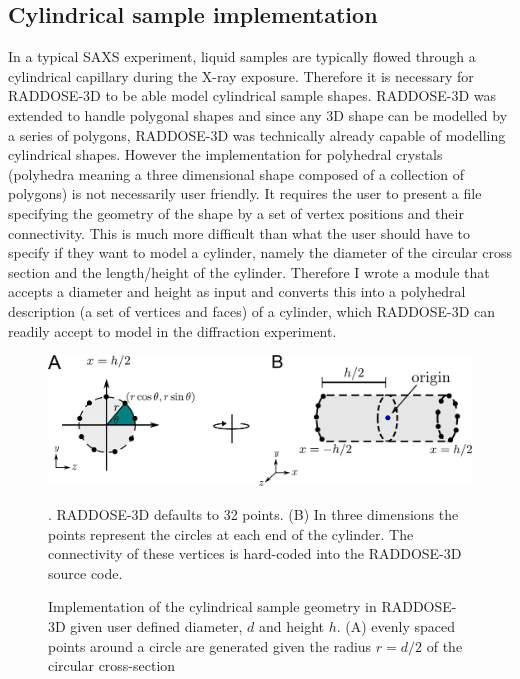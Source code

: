 \subsection{Cylindrical sample implementation}
\label{sub:Cylindrical sample implementation}
In a typical SAXS experiment, liquid samples are typically flowed through a cylindrical capillary during the X-ray exposure.
Therefore it is necessary for RADDOSE-3D to be able model cylindrical sample shapes.
RADDOSE-3D was extended to handle polygonal shapes \cite{bury2015radiation} and since any 3D shape can be modelled by a series of polygons, RADDOSE-3D was technically already capable of modelling cylindrical shapes.
However the implementation for polyhedral crystals (polyhedra meaning a three dimensional shape composed of a collection of polygons) is not necessarily user friendly.
It requires the user to present a file specifying the geometry of the shape by a set of vertex positions and their connectivity.
This is much more difficult than what the user should have to specify if they want to model a cylinder, namely the diameter of the circular cross section and the length/height of the cylinder.
Therefore I wrote a module that accepts a diameter and height as input and converts this into a polyhedral description (a set of vertices and faces) of a cylinder, which RADDOSE-3D can readily accept to model in the diffraction experiment.
\begin{figure}
    \centering
    \includegraphics[width=1\textwidth]{figures/saxs/cylinder_implementation.pdf}
    \caption{Implementation of the cylindrical sample geometry in RADDOSE-3D given user defined diameter, $d$ and height $h$. (A) evenly spaced points around a circle are generated given the radius $r = d/2$ of the circular cross-section}. RADDOSE-3D defaults to 32 points. (B) In three dimensions the points represent the circles at each end of the cylinder. The connectivity of these vertices is hard-coded into the RADDOSE-3D source code.
    \label{fig:Cylindrical implementation}
\end{figure}

